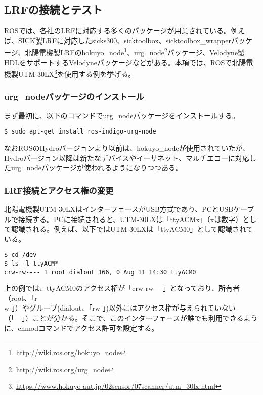 \subsection{LRFの接続とテスト}

ROSでは、各社のLRFに対応する多くのパッケージが用意されている。例えば、SICK製LRFに対応したsicks300、sicktoolbox、sicktoolbox\_wrapperパッケージ、北陽電機製LRFのhokuyo\_node\footnote{\url{http://wiki.ros.org/hokuyo\_node}}、urg\_node\footnote{\url{http://wiki.ros.org/urg\_node}}パッケージ、Velodyne製HDLをサポートするVelodyneパッケージなどがある。本項では、ROSで北陽電機製UTM-30LX\footnote{\url{https://www.hokuyo-aut.jp/02sensor/07scanner/utm\_30lx.html}}を使用する例を挙げる。

\subsubsection{urg\_nodeパッケージのインストール}

まず最初に、以下のコマンドでurg\_nodeパッケージをインストールする。

\begin{lstlisting}[language=ROS]
$ sudo apt-get install ros-indigo-urg-node
\end{lstlisting}

なおROSのHydroバージョンより以前は、hokuyo\_nodeが使用されていたが、Hydroバージョン以降は新たなデバイスやイーサネット、マルチエコーに対応したurg\_nodeパッケージが使われるようになりつつある。

\subsubsection{LRF接続とアクセス権の変更}

北陽電機製UTM-30LXはインターフェースがUSB方式であり、PCとUSBケーブルで接続する。PCに接続されると、UTM-30LXは「ttyACMx」（xは数字）として認識される。例えば、以下ではUTM-30LXは「ttyACM0」として認識されている。

\begin{lstlisting}[language=ROS]
$ cd /dev
$ ls -l ttyACM*
crw-rw---- 1 root dialout 166, 0 Aug 11 14:30 ttyACM0
\end{lstlisting}

上の例では、ttyACM0のアクセス権が「crw-rw----」となっており、所有者（root、「r\\w-」）やグループ(dialout、「rw-」)以外にはアクセス権が与えられていない（「---」）ことが分かる。そこで、このインターフェースが誰でも利用できるように、chmodコマンドでアクセス許可を設定する。

